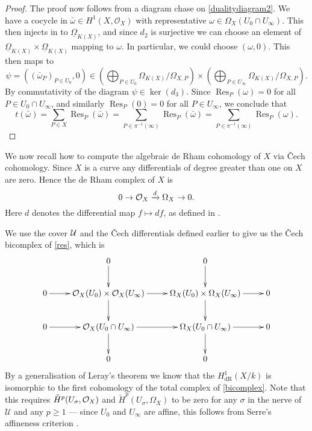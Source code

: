 \documentclass[draft, 11pt]{article} %
\theoremstyle{plain}
\theoremstyle{remark}
\newcommand{\cO}{{\cal O}}
\newcommand{\cU}{{\mathcal U}}
\newcommand{\cech}{\v{C}ech }
\newcommand{\hone}{H^1(X,\mathcal{O}_X)}
\newcommand{\derhamhone}{H_{\text {dR}}^1(X/k)}
\DeclareMathOperator{\res}{Res}
\begin{document}
\begin{proof}
The proof now follows from a diagram chase on \eqref{dualitydiagram2}.
 We have a cocycle in $\bar \omega \in \hone$ with representative $\omega \in \Omega_X(U_0 \cap U_\infty)$.
This then injects in to $\underline{\Omega}_{K(X)}$, and since $d_2$ is surjective we can choose an element of $\underline{\Omega}_{K(X)} \times \underline{\Omega}_{K(X)}$ mapping to $\omega$.
In particular, we could choose $(\omega,0)$.
This then maps to 
\[
\psi = ((\bar{\omega}_P)_{P\in U_0}, 0) \in \left( \bigoplus_{P \in U_0} \Omega_{K(X)}/\Omega_{X,P}\right) \times \left( \bigoplus_{P \in U_\infty} \Omega_{K(X)}/\Omega_{X,P} \right).
\]
By commutativity of the diagram $\psi \in \ker(d_3)$.
Since $\res_P(\omega)=0$ for all $P \in U_0 \cap U_\infty$, and similarly $\res_P(0)=0$ for all $P \in U_\infty$, we conclude that 
\[
t(\bar \omega) = \sum_{P \in X}\res_P(\bar \omega) = \sum_{P \in \pi^{-1}(\infty)} \res_P(\bar \omega) = \sum_{P \in \pi^{-1}(\infty)} \res_P(\omega).
\]
\end{proof}

We now recall how to compute the algebraic de Rham cohomology of $X$ via \cech cohomology.
Since $X$ is a curve any differentials of degree greater than one on $X$ are zero.
Hence the de Rham complex of $X$ is 
\begin{equation}\label{res}
0 \rightarrow \cO_X \xrightarrow{d} \Omega_X \rightarrow 0.
\end{equation}
Here $d$ denotes the differential map $f \mapsto df$, as defined in \cite[Chap II, \S 8, Pg. 172]{hart}.

We use the cover $\cal U$ and the \cech differentials defined earlier to give us the \cech bicomplex of \eqref{res}, which is
\begin{equation}\label{bicomplex}
\xymatrix{ & 0 \ar[d] & 0 \ar[d] & \\
0 \ar[r] & \cO_X(U_0) \times \cO_X(U_\infty) \ar[d] \ar[r] & \Omega_X(U_0) \times \Omega_X(U_\infty) \ar[d] \ar[r] & 0 \\
0 \ar[r] & \cO_X(U_0\cap U_\infty) \ar[d] \ar[r] & \Omega_X(U_0 \cap U_\infty) \ar[r] \ar[d] & 0 \\
& 0 & 0 &}
\end{equation}
By a generalisation of Leray's theorem \cite[Cor 12.4.7]{EGA0III} we know that the $\derhamhone$ is isomorphic to the first cohomology of the total complex of \eqref{bicomplex}.
Note that this requires ${\check H}^p(U_\sigma, \cO_X)$ and ${\check H}^p(U_\sigma, \Omega_X)$ to be zero for any $\sigma$ in the nerve of $\cU$ and any $p \geq 1$ ---
since $U_0$ and $U_\infty$ are affine, this follows from Serre's affineness criterion \cite[Thm 5.2.23]{liu}.
\end{document}
